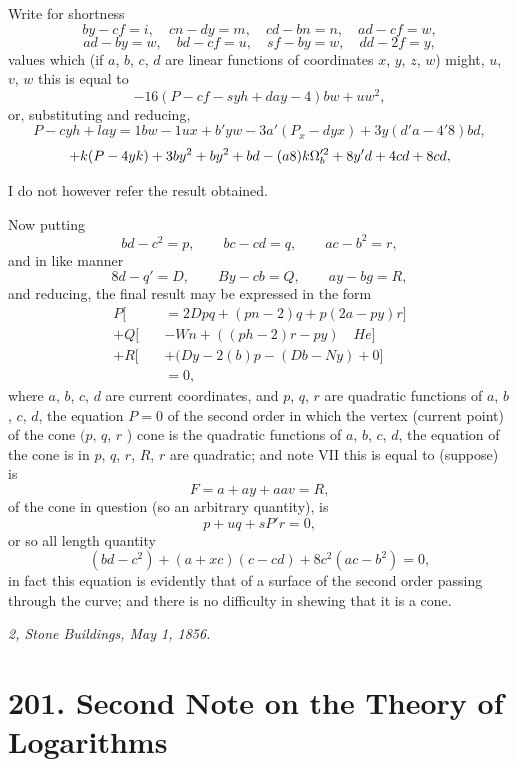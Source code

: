 \documentclass[11pt,a4paper]{book}
\begin{document}
Write for shortness
\[
by - cf = i, \quad cn - dy = m, \quad cd - bn = n, \quad ad - cf = w,
\]
\[
ad - by = w, \quad bd - cf = u, \quad sf - by = w, \quad dd - 2f = y,
\]
values which (if $a$, $b$, $c$, $d$ are linear functions of coordinates $x$, $y$, $z$, $w$) might, $u$, $v$, $w$
this is equal to
\[
-16(P - cf - syh + day - 4)bw + uw^2,
\]
or, substituting and reducing,
\[
P - cy h + lay = 1bw - 1ux + b'y w - 3a'(P_x - dy x) + 3y(d'a - 4'8) bd,
\]
\[
+ k(P - 4y k) + 3by^2 + by^2 + bd\\
- (a8) k\Omega_b'^2 + 8y'd + 4cd + 8cd,
\]

I do not however refer the result obtained.

\medskip

Now putting
\[
bd - c^2 = p,\qquad bc - cd = q,\qquad ac - b^2 = r,
\]
and in like manner
\[
8d - q' = D,\qquad By - cb = Q,\qquad ay - bg = R,
\]
and reducing, the final result may be expressed in the form
\begin{align*}
P[\quad &= 2Dpq + (pn - 2)q + p(2a - py)r]\\
+ Q[\quad &-Wn + ((ph - 2)r - py)\quad He]\\
+ R[\quad & + (Dy - 2(b)p - (Db - Ny) + 0]\\
&= 0,
\end{align*}
where $a$, $b$, $c$, $d$ are current coordinates, and $p$, $q$, $r$ are quadratic functions of $a$, $b$, $c$, $d$,
the equation $P = 0$ of the second order in which the vertex (current point) of the cone $(p$, $q$, $r$ ) cone is the quadratic functions of $a$, $b$, $c$, $d$,
the equation of the cone is in $p$, $q$, $r$, $R$, $r$ are quadratic; and note VII
this is equal to (suppose) is
\[
F = a + ay + a a v = R,
\]
of the cone in question (so an arbitrary quantity), is
\[
p + uq + sP'r = 0,
\]
or so all length quantity
\[
(bd - c^2) + (a + xc)(c - cd) + 8c^2(ac - b^2) = 0,
\]
in fact this equation is evidently that of a surface of the second order passing
through the curve; and there is no difficulty in shewing that it is a cone.

\bigskip

\noindent\textit{2, Stone Buildings, May 1, 1856.}

\newpage


\section*{201. Second Note on the Theory of Logarithms}
\end{document}
